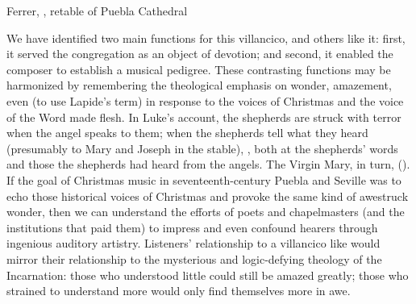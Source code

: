 {Ferrer, , retable of Puebla Cathedral}

We have identified two main functions for this villancico, and others like it:
first, it served the congregation as an object of devotion; and second, it
enabled the composer to establish a musical pedigree.
These contrasting functions may be harmonized by remembering the theological
emphasis on wonder, amazement, even  (to use Lapide's term)
in response to the voices of Christmas and the voice of the Word made flesh.
In Luke's account, the shepherds are struck with terror when the angel speaks to
them; when the shepherds tell what they heard (presumably to Mary and Joseph in
the stable), , both at the shepherds' words
and those the shepherds had heard from the angels.
The Virgin Mary, in turn,  ().
If the goal of Christmas music in seventeenth-century Puebla and Seville was to
echo those historical voices of Christmas and provoke the same kind of awestruck
wonder, then we can understand the efforts of poets and chapelmasters (and the
institutions that paid them) to impress and even confound hearers through
ingenious auditory artistry.
Listeners' relationship to a villancico like 
would mirror their relationship to the mysterious and logic-defying theology of
the Incarnation: those who understood little could still be amazed greatly;
those who strained to understand more would only find themselves more in awe.

\endinput

